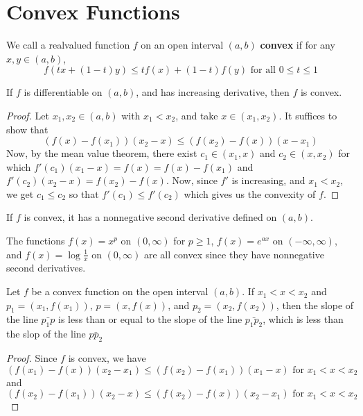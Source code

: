 \section{Convex Functions}

\begin{definition}
    We call a realvalued function $f$ on an open interval $(a,b)$
    \textbf{convex} if for any $x,y \in (a,b)$,
    \begin{equation*}
        f(tx+(1-t)y) \leq tf(x)+(1-t)f(y) \text{ for all } 0 \leq t \leq 1
    \end{equation*}
\end{definition}

\begin{lemma}\label{11.5.1}
    If $f$ is differentiable on $(a,b)$, and has increasing derivative, then $f$
    is convex.
\end{lemma}
\begin{proof}
    Let $x_1,x_2 \in (a,b)$ with $x_1<x_2$, and take $x \in (x_1,x_2)$. It
    suffices to show that
    \begin{equation*}
        (f(x)-f(x_1))(x_2-x) \leq (f(x_2)-f(x))(x-x_1)
    \end{equation*}
    Now, by the mean value theorem, there exist $c_1 \in (x_1,x)$ and $c_2 \in
    (x,x_2)$ for which $f'(c_1)(x_1-x)=f(x)=f(x)-f(x_1)$ and $f'(c_2)(x_2-x)=
    f(x_2)-f(x)$. Now, since $f'$ is increasing, and $x_1<x_2$, we get $c_1 \leq
    c_2$ so that $f'(c_1) \leq f'(c_2)$ which gives us the convexity of $f$.
\end{proof}
\begin{corollary}
    If $f$ is convex, it has a nonnegative second derivative defined on $(a,b)$.
\end{corollary}

\begin{example}\label{example_11.4}
    The functions $f(x)=x^p$ on $(0,\infty)$ for $p \geq 1$, $f(x)=e^{ax}$ on
    $(-\infty,\infty)$, and $f(x)=\log{\frac{1}{x}}$ on $(0, \infty)$ are all
    convex since they have nonnegative second derivatives.
\end{example}

\begin{lemma}\label{11.5.2}
    Let $f$ be a convex function on the open interval $(a,b)$. If $x_1<x<x_2$ and
    $p_1=(x_1,f(x_1))$, $p=(x,f(x))$, and $p_2=(x_2,f(x_2))$, then the slope of
    the line $\bar{p_1p}$ is less than or equal to the slope of the line
    $\bar{p_1p_2}$, which is less than the slop of the line $\bar{pp_2}$
\end{lemma}
\begin{proof}
    Since $f$ is convex, we have
    \begin{equation*}
        (f(x_1)-f(x))(x_2-x_1) \leq (f(x_2)-f(x_1))(x_1-x)  \text{ for }
        x_1<x<x_2
    \end{equation*}
    and
    \begin{equation*}
        (f(x_2)-f(x_1))(x_2-x) \leq (f(x_2)-f(x))(x_2-x_1)  \text{ for }
        x_1<x<x_2
    \end{equation*}
\end{proof}


